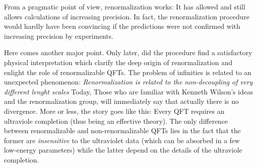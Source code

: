 From a pragmatic point of view, 
renormalization works: It 
has allowed and still allows calculations of increasing precision.
In fact, the renormalization procedure would hardly have been convincing if the
predictions were not confirmed with increasing precision by experiments.

Here comes another major point. 
Only later, did the procedure find a satisfactory physical interpretation which
clarify the deep origin of renormalization and enlight the role of
renormalizable QFTs.
   The problem of infinities is related to an unexpected phenomenon:
   \emph{Renormalization is related to the non-decoupling of very different
      lenght scales}
Today, Those who are familiar with Kenneth Wilson's ideas and the renormalization
group, will immediately say that actually there is no divergence.
More or less, the story goes like this: 
Every QFT requires an ultraviole completion (thus being an effective theory).
The only difference between renormalizable and non-renormalizable QFTs lies in
the fact that the former are \emph{insensitive} to the ultraviolet data (which
can be absorbed in a few low-energy parameters) while the latter depend on the
details of the ultraviole completion.




 
